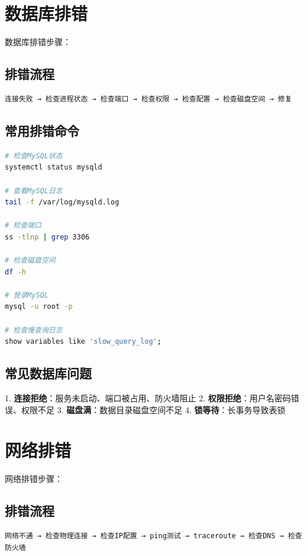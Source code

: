 \documentclass[12pt,UTF8]{ctexbook}
\begin{document}
\section{数据库排错}
\label{sec:db-troubleshoot}

数据库排错步骤：

\subsection*{排错流程}
\begin{lstlisting}
连接失败 → 检查进程状态 → 检查端口 → 检查权限 → 检查配置 → 检查磁盘空间 → 修复
\end{lstlisting}

\subsection*{常用排错命令}
\begin{lstlisting}[language=bash]
# 检查MySQL状态
systemctl status mysqld

# 查看MySQL日志
tail -f /var/log/mysqld.log

# 检查端口
ss -tlnp | grep 3306

# 检查磁盘空间
df -h

# 登录MySQL
mysql -u root -p

# 检查慢查询日志
show variables like 'slow_query_log';
\end{lstlisting}

\subsection*{常见数据库问题}
1. \textbf{连接拒绝}：服务未启动、端口被占用、防火墙阻止
2. \textbf{权限拒绝}：用户名密码错误、权限不足
3. \textbf{磁盘满}：数据目录磁盘空间不足
4. \textbf{锁等待}：长事务导致表锁

\section{网络排错}
\label{sec:net-troubleshoot}

网络排错步骤：

\subsection*{排错流程}
\begin{lstlisting}
网络不通 → 检查物理连接 → 检查IP配置 → ping测试 → traceroute → 检查DNS → 检查防火墙
\end{lstlisting}
\end{document}
